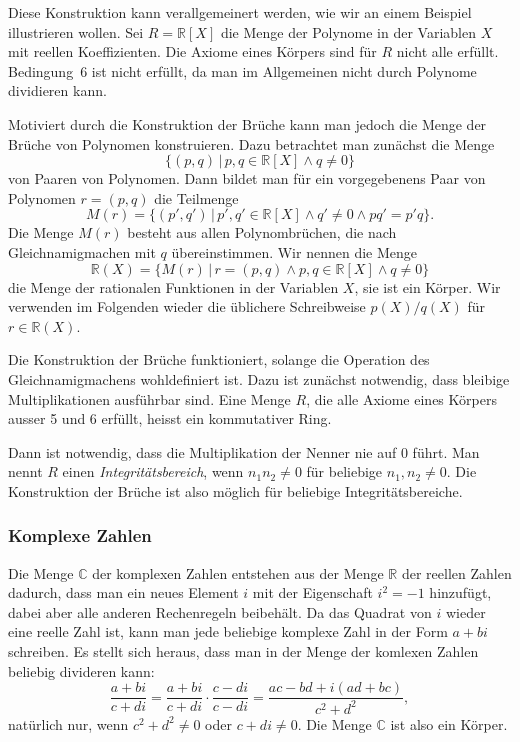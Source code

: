 Diese Konstruktion kann verallgemeinert werden, wie wir an einem
Beispiel illustrieren wollen.
Sei $R=\mathbb R[X]$ die Menge der Polynome in der Variablen $X$
mit reellen Koeffizienten.
Die Axiome eines Körpers sind für $R$ nicht alle erfüllt.
Bedingung~6 ist nicht erfüllt, da man im Allgemeinen nicht durch Polynome
dividieren kann.

Motiviert durch die Konstruktion der Brüche kann man jedoch die Menge
der Brüche von Polynomen konstruieren.
Dazu betrachtet man zunächst die Menge
\[
\{ (p,q)\,|\, p,q\in \mathbb R[X]\wedge q\ne 0\}
\]
von Paaren von Polynomen.
Dann bildet man für ein vorgegebenens Paar von Polynomen $r=(p,q)$ die
Teilmenge
\[
M(r)
=
\{ (p',q')\,|\, p',q'\in \mathbb R[X]\wedge q'\ne 0\wedge pq'=p'q\}.
\]
Die Menge $M(r)$ besteht aus allen Polynombrüchen, die nach 
Gleichnamigmachen mit $q$ übereinstimmen.
Wir nennen die Menge 
\[
\mathbb R(X)
=
\{ M(r)\, |\, r=(p,q)\wedge p,q\in\mathbb R[X]\wedge q\ne 0\}
\]
die Menge der rationalen Funktionen in der Variablen $X$, sie ist
ein Körper.
Wir verwenden im Folgenden wieder die üblichere Schreibweise $p(X)/q(X)$
für $r\in\mathbb R(X)$.

Die Konstruktion der Brüche funktioniert, solange die Operation des
Gleichnamigmachens wohldefiniert ist.
Dazu ist zunächst notwendig, dass bleibige Multiplikationen ausführbar
sind.
Eine Menge $R$, die alle Axiome eines Körpers ausser 5 und 6 erfüllt,
heisst ein kommutativer Ring.

Dann ist notwendig, dass die Multiplikation der Nenner nie auf $0$ führt.
Man nennt $R$ einen {\em Integritätsbereich},
wenn $n_1n_2\ne 0$ für beliebige $n_1,n_2\ne 0$.
%
Die Konstruktion der Brüche ist also möglich für beliebige
Integritätsbereiche.

\subsubsection{Komplexe Zahlen}
Die Menge $\mathbb C$ der komplexen Zahlen entstehen aus der Menge $\mathbb R$
der reellen Zahlen dadurch, dass man ein neues Element $i$ mit der Eigenschaft
$i^2=-1$ hinzufügt, dabei aber alle anderen Rechenregeln beibehält.
Da das Quadrat von $i$ wieder eine reelle Zahl ist, kann man jede beliebige
komplexe Zahl in der Form $a+bi$ schreiben.
Es stellt sich heraus, dass man in der Menge der komlexen Zahlen beliebig
divideren kann:
\[
\frac{a+bi}{c+di}
=
\frac{a+bi}{c+di}
\cdot
\frac{c-di}{c-di}
=
\frac{ac-bd + i(ad+bc)}{c^2 + d^2},
\]
natürlich nur, wenn $c^2+d^2\ne 0$ oder $c+di\ne 0$.
Die Menge $\mathbb C$ ist also ein Körper.

